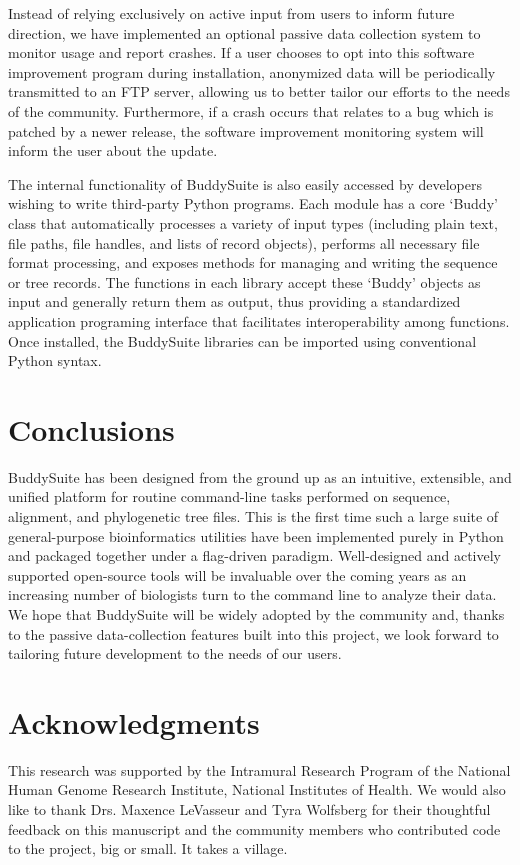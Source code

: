 \documentclass[nogrid]{MBE_article}%
\begin{document}
Instead of relying exclusively on active input from users to inform future direction, we have implemented an optional passive data collection system to monitor usage and report crashes. If a user chooses to opt into this software improvement program during installation, anonymized data will be periodically transmitted to an FTP server, allowing us to better tailor our efforts to the needs of the community. Furthermore, if a crash occurs that relates to a bug which is patched by a newer release, the software improvement monitoring system will inform the user about the update.

The internal functionality of BuddySuite is also easily accessed by developers wishing to write third-party Python programs. Each module has a core `Buddy' class that automatically processes a variety of input types (including plain text, file paths, file handles, and lists of record objects), performs all necessary file format processing, and exposes methods for managing and writing the sequence or tree records. The functions in each library accept these `Buddy' objects as input and generally return them as output, thus providing a standardized application programing interface that facilitates interoperability among functions. Once installed, the BuddySuite libraries can be imported using conventional Python syntax.

\section{Conclusions}
BuddySuite has been designed from the ground up as an intuitive, extensible, and unified platform for routine command-line tasks performed on sequence, alignment, and phylogenetic tree files. This is the first time such a large suite of general-purpose bioinformatics utilities have been implemented purely in Python and packaged together under a flag-driven paradigm. Well-designed and actively supported open-source tools will be invaluable over the coming years as an increasing number of biologists turn to the command line to analyze their data. We hope that BuddySuite will be widely adopted by the community and, thanks to the passive data-collection features built into this project, we look forward to tailoring future development to the needs of our users.


\section{Acknowledgments}
This research was supported by the Intramural Research Program of the National Human Genome Research Institute, National Institutes of Health. We would also like to thank Drs. Maxence LeVasseur and Tyra Wolfsberg for their thoughtful feedback on this manuscript and the community members who contributed code to the project, big or small. It takes a village.
\end{document}
